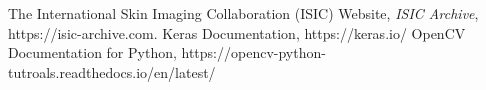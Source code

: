 \documentclass[10pt]{IEEEtran}
\begin{document}
\begin{thebibliography}{9}
The International Skin Imaging Collaboration (ISIC) Website, \emph{ISIC Archive}, https://isic-archive.com.
Keras Documentation, https://keras.io/
OpenCV Documentation for Python, https://opencv-python-tutroals.readthedocs.io/en/latest/

\end{thebibliography}
\end{document}
